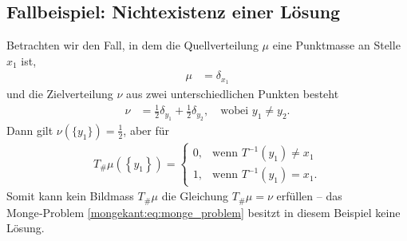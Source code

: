 \subsection{Fallbeispiel: Nichtexistenz einer Lösung%
\label{mongekant:subsection:monge_inexistence}}
Betrachten wir den Fall,
in dem die Quellverteilung $\mu$ eine Punktmasse an Stelle $x_1$ ist,
\begin{align*}
\mu
&=
\delta_{x_1}
\end{align*}
und die Zielverteilung $\nu$ aus zwei unterschiedlichen Punkten besteht
\begin{align*}
\nu
&=
\frac{1}{2} \delta_{y_1} + \frac{1}{2} \delta_{y_2}
,\quad
\text{wobei } y_1 \neq y_2
.
\end{align*}
Dann gilt $\nu(\{y_1\}) = \frac{1}{2}$,
aber für
\begin{align*}
T_{\#}\mu\left(\left\{y_1\right\}\right)
=
\begin{cases}
0,
&\text{wenn }
T^{-1}(y_1)
\neq
x_1
\\
1,
&\text{wenn }
T^{-1}(y_1)
=
x_1
.
\end{cases}
\end{align*}
Somit kann kein Bildmass $T_{\#}\mu$ die Gleichung $T_{\#}\mu=\nu$ erfüllen --
das Monge‑Problem \eqref{mongekant:eq:monge_problem}
besitzt in diesem Beispiel keine Lösung.


